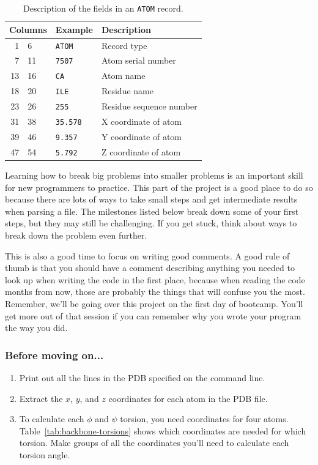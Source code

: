 \documentclass{article}
\newcommand{\bbphi}{\ensuremath{\phi}}
\newcommand{\bbpsi}{\ensuremath{\psi}}
\newenvironment{problems}
{\subsubsection{Before moving on...} \begin{enumerate}}
{\end{enumerate}}
\begin{document}
\begin{table}[h]
\centering
\begin{tabular}{r@{ - }lcll}
\toprule
\multicolumn{3}{l}{Columns} & Example         & Description                         \\
\midrule
 1 &  6 & & \texttt{ATOM}   & Record type                         \\
 7 & 11 & & \texttt{7507}   & Atom serial number                  \\
13 & 16 & & \texttt{CA}     & Atom name                           \\
18 & 20 & & \texttt{ILE}    & Residue name                        \\
23 & 26 & & \texttt{255}    & Residue sequence number             \\
31 & 38 & & \texttt{35.578} & X coordinate of atom                \\
39 & 46 & & \texttt{9.357}  & Y coordinate of atom                \\
47 & 54 & & \texttt{5.792}  & Z coordinate of atom                \\
\bottomrule
\end{tabular}
\caption{Description of the fields in an \texttt{ATOM} record.}
\label{tab:pdb-atom-record}
\end{table}

Learning how to break big problems into smaller problems is an important skill 
for new programmers to practice.  This part of the project is a good place to 
do so because there are lots of ways to take small steps and get intermediate 
results when parsing a file.  The milestones listed below break down some of 
your first steps, but they may still be challenging.  If you get stuck, think 
about ways to break down the problem even further.

This is also a good time to focus on writing good comments.  A good rule of 
thumb is that you should have a comment describing anything you needed to look 
up when writing the code in the first place, because when reading the code 
months from now, those are probably the things that will confuse you the most.  
Remember, we'll be going over this project on the first day of bootcamp.  
You'll get more out of that session if you can remember why you wrote your 
program the way you did.

\begin{problems}
 \item Print out all the lines in the PDB specified on the command line.

 \item Extract the $x$, $y$, and $z$ coordinates for each atom in the PDB file.

 \item To calculate each \bbphi{} and \bbpsi{} torsion, you need coordinates 
  for four atoms.  Table~\ref{tab:backbone-torsions} shows which coordinates 
  are needed for which torsion.  Make groups of all the coordinates you'll need 
  to calculate each torsion angle.
\end{problems}
\end{document}

